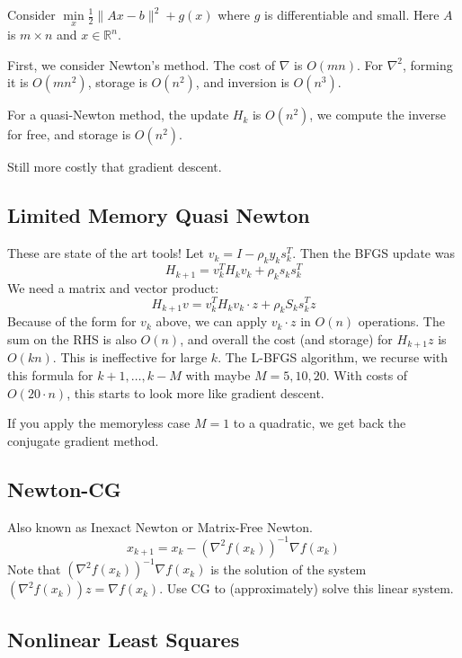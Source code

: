 \documentclass[english, 11pt]{article}
\begin{document}
\begin{exmp}
Consider $\min \limits_x \frac{1}{2} \|Ax-b\|^2 + g(x)$ where $g$ is differentiable and small. Here $A$ is $m \times n$ and $x \in \mathbb{R}^n$.  

First, we consider Newton's method. The cost of $\nabla$ is $O(mn)$. For $\nabla^2$, forming it is $O(mn^2)$, storage is $O(n^2)$, and inversion is $O(n^3)$.

For a quasi-Newton method, the update $H_k$ is $O(n^2)$, we compute the inverse for free, and storage is $O(n^2)$.

Still more costly that gradient descent.
\end{exmp}


\subsection{Limited Memory Quasi Newton}
These are state of the art tools! Let $v_k = I - \rho_k y_k s_k^T$. Then the BFGS update was
\[
H_{k+1} = v_k^T H_k v_k + \rho_k s_k s_k^T
\]
We need a matrix and vector product:
\[
H_{k+1} v = v_k^T H_k v_k \cdot z + \rho_k S_k s_k^T z
\]
Because of the form for $v_k$ above, we can apply $v_k \cdot z$ in $O(n)$ operations. The sum on the RHS is also $O(n)$, and overall the cost  (and storage) for $H_{k+1} z$ is $O(kn)$. This is ineffective for large $k$. The L-BFGS algorithm, we recurse with this formula for $k+1,\dots,k-M$ with maybe $M=5,10,20$. With costs of $O(20 \cdot n)$, this starts to look more like gradient descent.

\begin{rem}
If you apply the memoryless case $M=1$ to a quadratic, we get back the conjugate gradient method.
\end{rem}

\subsection{Newton-CG}
Also known as Inexact Newton or Matrix-Free Newton. 
\[
x_{k+1} = x_k - \left(\nabla^2 f(x_k) \right)^{-1} \nabla f(x_k)
\]
Note that $\left(\nabla^2 f(x_k) \right)^{-1} \nabla f(x_k)$ is the solution of the system $\left(\nabla^2 f(x_k) \right) z =  \nabla f(x_k)$. Use CG to (approximately) solve this linear system.

\subsection{Nonlinear Least Squares}
\end{document}

